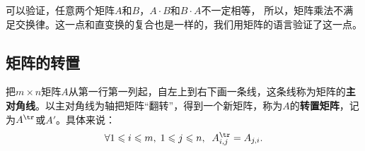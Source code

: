 \documentclass[12pt,UTF8]{ctexbook}
\begin{document}
可以验证，任意两个矩阵$A$和$B$，$A\cdot B$和$B \cdot A$不一定相等，
所以，矩阵乘法不满足交换律。这一点和直变换的复合也是一样的，我们用矩阵的语言验证了这一点。






\subsection{矩阵的转置}
把$m\times n$矩阵$A$从第一行第一列起，自左上到右下画一条线，这条线称为矩阵的\textbf{主对角线}。以主对角线为轴把矩阵“翻转”，得到一个新矩阵，称为$A$的\textbf{转置矩阵}，记为$A^{\tr}$或$A'$。具体来说：
$$ \forall 1\leqslant i \leqslant m, \; 1 \leqslant j \leqslant n, \;\; A^{\tr}_{i,j} = A_{j, i}.$$
\end{document}
